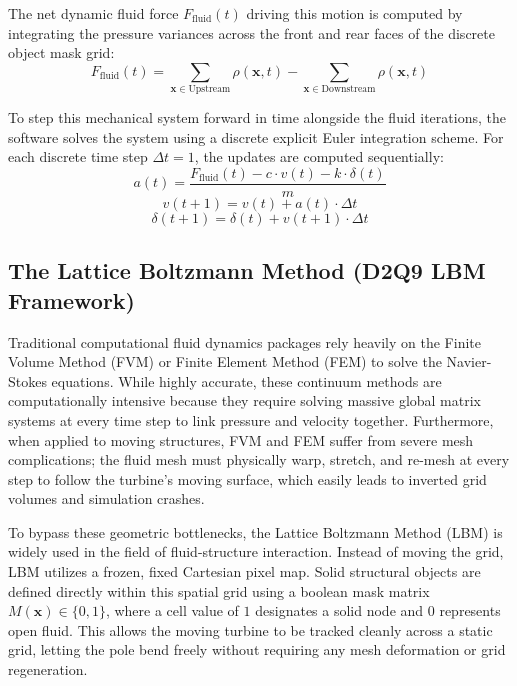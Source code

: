 \documentclass[11pt,a4paper]{article}
\begin{document}
The net dynamic fluid force $F_{\text{fluid}}(t)$ driving this motion is computed by integrating the pressure variances across the front and rear faces of the discrete object mask grid:
\begin{equation}
F_{\text{fluid}}(t) = \sum_{\mathbf{x} \in \text{Upstream}} \rho(\mathbf{x}, t) - \sum_{\mathbf{x} \in \text{Downstream}} \rho(\mathbf{x}, t)
\end{equation}

To step this mechanical system forward in time alongside the fluid iterations, the software solves the system using a discrete explicit Euler integration scheme. For each discrete time step $\Delta t = 1$, the updates are computed sequentially:
\begin{equation}
a(t) = \frac{F_{\text{fluid}}(t) - c \cdot v(t) - k \cdot \delta(t)}{m}
\end{equation}
\begin{equation}
v(t+1) = v(t) + a(t) \cdot \Delta t
\end{equation}
\begin{equation}
\delta(t+1) = \delta(t) + v(t+1) \cdot \Delta t
\end{equation}

\subsection{The Lattice Boltzmann Method (D2Q9 LBM Framework)}
Traditional computational fluid dynamics packages rely heavily on the Finite Volume Method (FVM) or Finite Element Method (FEM) to solve the Navier-Stokes equations. While highly accurate, these continuum methods are computationally intensive because they require solving massive global matrix systems at every time step to link pressure and velocity together. Furthermore, when applied to moving structures, FVM and FEM suffer from severe mesh complications; the fluid mesh must physically warp, stretch, and re-mesh at every step to follow the turbine's moving surface, which easily leads to inverted grid volumes and simulation crashes.

To bypass these geometric bottlenecks, the Lattice Boltzmann Method (LBM) is widely used in the field of fluid-structure interaction. Instead of moving the grid, LBM utilizes a frozen, fixed Cartesian pixel map. Solid structural objects are defined directly within this spatial grid using a boolean mask matrix $M(\mathbf{x}) \in \{0, 1\}$, where a cell value of $1$ designates a solid node and $0$ represents open fluid. This allows the moving turbine to be tracked cleanly across a static grid, letting the pole bend freely without requiring any mesh deformation or grid regeneration.
\end{document}

